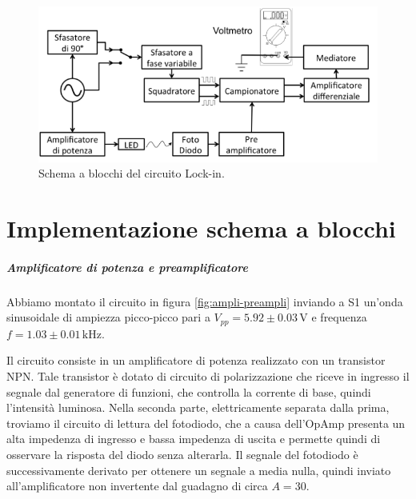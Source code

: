\documentclass[10pt,a4paper]{article}
\begin{document}
\begin{figure}[!htb]
  \centering
  \includegraphics[scale=0.75]{schemablocchi.png}
\caption{Schema a blocchi del circuito Lock-in.\label{fig:schemablocchi}}
\end{figure}


\section{Implementazione schema a blocchi}

\subparagraph{Amplificatore di potenza e preamplificatore}
Abbiamo montato il circuito in figura \ref{fig:ampli-preampli} inviando a S1 un'onda sinusoidale di ampiezza picco-picco pari a $V_{pp}= 5.92\pm0.03 \,\mbox{V}$ e frequenza $f=1.03\pm0.01\,\mbox{kHz}$. 

Il circuito consiste in un amplificatore di potenza realizzato con un transistor NPN. Tale transistor è
dotato di circuito di polarizzazione che riceve in ingresso il segnale dal generatore di funzioni, che controlla la corrente di base, quindi l'intensità luminosa. Nella seconda parte, elettricamente separata dalla prima, troviamo il  circuito di lettura del fotodiodo, che a causa dell'OpAmp presenta un alta impedenza di ingresso e bassa impedenza di uscita e permette quindi di osservare la risposta del diodo senza alterarla.%
Il segnale del fotodiodo è successivamente derivato per ottenere un segnale a media nulla, quindi inviato all'amplificatore non invertente dal guadagno di circa $A = 30$.\\ 
\end{document}
